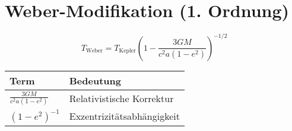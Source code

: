 \section{Weber-Modifikation (1. Ordnung)}
\[
T_{\text{Weber}} = T_{\text{Kepler}} \left(1 - \frac{3GM}{c^2a(1-e^2)}\right)^{-1/2}
\]

\begin{table}[h]
\centering
\begin{tabular}{|l|l|}
\hline
\textbf{Term} & \textbf{Bedeutung} \\ \hline
$\frac{3GM}{c^2a(1-e^2)}$ & Relativistische Korrektur \\ \hline
$(1-e^2)^{-1}$ & Exzentrizitätsabhängigkeit \\ \hline
\end{tabular}
\end{table}